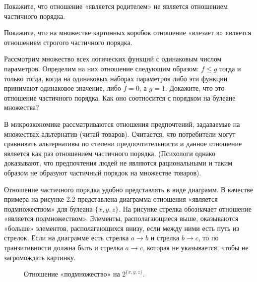 \begin{exercise}
Покажите, что отношение «является родителем» не является отношением частичного порядка.
\end{exercise}

\begin{exercise}
Покажите, что на множестве картонных коробок отношение «влезает в» является отношением строгого частичного порядка.
\end{exercise}

\begin{exercise}
Рассмотрим множество всех логических функций с одинаковым числом параметров. Определим на них отношение следующим образом: $f\le g$ тогда и только тогда, когда на одинаковых наборах параметров либо эти функции принимают одинаковое значение, либо $f=0$, а $g=1$. Докажите, что это отношение частичного порядка. Как оно соотносится с порядком на булеане множества?
\end{exercise}

\begin{example}
В микроэкономике рассматриваются отношения предпочтений, задаваемые на множествах альтернатив (читай товаров). Считается, что потребители могут сравнивать альтернативы по степени предпочтительности и данное отношение является как раз отношением частичного порядка. (Психологи однако доказывают, что предпочтения людей не являются рациональными и таким образом не образуют частичный порядок на множестве товаров).
\end{example}

Отношение частичного порядка удобно представлять в виде диаграмм. В качестве примера на рисунке 2.2 представлена диаграмма отношения «является подмножеством» для булеана $\{x, y, z\}$. На рисунке стрелка обозначает отношение «является подмножеством». Элементы, располагающиеся выше, оказываются «больше» элементов, располагающихся внизу, если между ними есть путь из стрелок. Если на диаграмме есть стрелка $a\to b$ и стрелка $b\to c$, то по транзитивности должна быть и стрелка $a\to c$, которая не указывается, чтобы не загромождать картинку.

\begin{figure}[h]
\centering
{}
\caption{Отношение «подмножество» на $2^{\{x, y, z\}}$.}
\end{figure}

